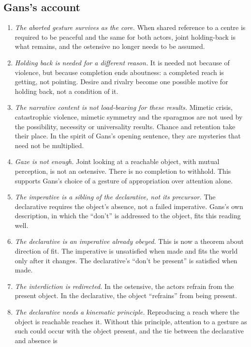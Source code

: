 \documentclass[11pt]{article}
\begin{document}
\subsection{Gans's account}
\begin{enumerate}
  \item \emph{The aborted gesture survives as the core.} When shared reference to a centre
    is required to be peaceful and the same for both actors, joint holding-back is what
    remains, and the ostensive no longer needs to be assumed.
  \item \emph{Holding back is needed for a different reason.} It is needed not because of
    violence, but because completion ends aboutness: a completed reach is getting, not
    pointing. Desire and rivalry become one possible motive for holding back, not a
    condition of it.
  \item \emph{The narrative content is not load-bearing for these results.} Mimetic crisis,
    catastrophic violence, mimetic symmetry and the sparagmos are not used by the
    possibility, necessity or universality results. Chance and retention take their place.
    In the spirit of Gans's opening sentence, they are mysteries that need not be
    multiplied.
  \item \emph{Gaze is not enough.} Joint looking at a reachable object, with mutual
    perception, is not an ostensive. There is no completion to withhold. This supports
    Gans's choice of a gesture of appropriation over attention alone.
  \item \emph{The imperative is a sibling of the declarative, not its precursor.} The
    declarative requires the object's absence, not a failed imperative. Gans's own
    description, in which the ``don't'' is addressed to the object, fits this reading
    well.
  \item \emph{The declarative is an imperative already obeyed.} This is now a theorem about
    direction of fit. The imperative is unsatisfied when made and fits the world only after
    it changes. The declarative's ``don't be present'' is satisfied when made.
  \item \emph{The interdiction is redirected.} In the ostensive, the actors refrain from the
    present object. In the declarative, the object ``refrains'' from being present.
  \item \emph{The declarative needs a kinematic principle.} Reproducing a reach where the
    object is reachable reaches it. Without this principle, attention to a gesture as such
    could occur with the object present, and the tie between the declarative and absence is

\end{enumerate}
\end{document}
